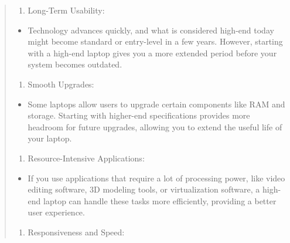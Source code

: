 \begin{leftbar}
\begin{quote}
\begin{enumerate}[leftmargin=*]
\def\labelenumi{\arabic{enumi}.}
\setcounter{enumi}{3}

\item
Long-Term Usability:
\end{enumerate}

\begin{itemize}

\item
Technology advances quickly, and what is considered high-end today might become standard or entry-level in a few years. However, starting with a high-end laptop gives you a more extended period before your system becomes outdated.
\end{itemize}

\begin{enumerate}[leftmargin=*]
\def\labelenumi{\arabic{enumi}.}
\setcounter{enumi}{4}

\item
Smooth Upgrades:
\end{enumerate}

\begin{itemize}

\item
Some laptops allow users to upgrade certain components like RAM and storage. Starting with higher-end specifications provides more headroom for future upgrades, allowing you to extend the useful life of your laptop.
\end{itemize}

\begin{enumerate}[leftmargin=*]
\def\labelenumi{\arabic{enumi}.}
\setcounter{enumi}{5}

\item
Resource-Intensive Applications:
\end{enumerate}

\begin{itemize}

\item
If you use applications that require a lot of processing power, like video editing software, 3D modeling tools, or virtualization software, a high-end laptop can handle these tasks more efficiently, providing a better user experience.
\end{itemize}

\begin{enumerate}[leftmargin=*]
\def\labelenumi{\arabic{enumi}.}
\setcounter{enumi}{6}

\item
Responsiveness and Speed:
\end{enumerate}


\end{quote}
\end{leftbar}
